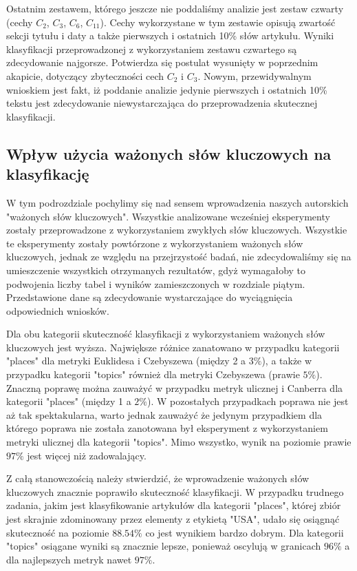 \documentclass{classrep}
\begin{document}
Ostatnim zestawem, którego jeszcze nie poddaliśmy analizie jest zestaw czwarty (cechy $C_{2}$,  $C_{3}$,  $C_{6}$,  $C_{11}$). Cechy wykorzystane w tym zestawie opisują zwartość sekcji tytułu i daty a także pierwszych i ostatnich 10\% słów artykułu. Wyniki klasyfikacji przeprowadzonej z wykorzystaniem zestawu czwartego są zdecydowanie najgorsze. Potwierdza się postulat wysunięty w poprzednim akapicie, dotyczący zbyteczności cech $C_{2}$ i $C_{3}$. Nowym, przewidywalnym wnioskiem jest fakt, iż poddanie analizie jedynie pierwszych i ostatnich 10\% tekstu jest zdecydowanie niewystarczająca do przeprowadzenia skutecznej klasyfikacji.

\subsection{Wpływ użycia ważonych słów kluczowych na klasyfikację}
W tym podrozdziale pochylimy się nad sensem wprowadzenia naszych autorskich "ważonych słów kluczowych". Wszystkie analizowane wcześniej eksperymenty zostały przeprowadzone z wykorzystaniem zwykłych słów kluczowych. Wszystkie te eksperymenty zostały powtórzone z wykorzystaniem ważonych słów kluczowych, jednak ze względu na przejrzystość badań, nie zdecydowaliśmy się na umieszczenie wszystkich otrzymanych rezultatów, gdyż wymagałoby to podwojenia liczby tabel i wyników zamieszczonych w rozdziale piątym. Przedstawione dane są zdecydowanie wystarczające do wyciągnięcia odpowiednich wniosków. \newline

Dla obu kategorii skuteczność klasyfikacji z wykorzystaniem ważonych słów kluczowych jest wyższa. Największe różnice zanatowano w przypadku kategorii "places" dla metryki Euklidesa i Czebyszewa (między 2 a $3\%$), a także w przypadku kategorii "topics" również dla metryki Czebyszewa (prawie $5\%$). Znaczną poprawę można zauważyć w przypadku metryk ulicznej i Canberra dla kategorii "places" (między 1 a $2\%$). W pozostałych przypadkach poprawa nie jest aż tak spektakularna, warto jednak zauważyć że jedynym przypadkiem dla którego poprawa nie została zanotowana był eksperyment z wykorzystaniem metryki ulicznej dla kategorii "topics". Mimo wszystko, wynik na poziomie prawie $97\%$ jest więcej niż zadowalający. \newline

Z całą stanowczością należy stwierdzić, że wprowadzenie ważonych słów kluczowych znacznie poprawiło skuteczność klasyfikacji. W przypadku trudnego zadania, jakim jest klasyfikowanie artykułów dla kategorii "places", której zbiór jest skrajnie zdominowany przez elementy z etykietą "USA", udało się osiągnąć skuteczność na poziomie $88.54\%$ co jest wynikiem bardzo dobrym. Dla kategorii "topics" osiągane wyniki są znacznie lepsze, ponieważ oscylują w granicach $96\%$ a dla najlepszych metryk nawet $97\%$.
\end{document}
